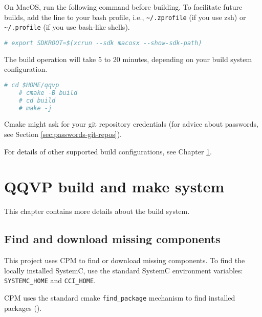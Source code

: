 \note On MacOS, run the following command before building. To facilitate
future builds, add the line to your bash profile, i.e.,
{\small{\lstinline!~/.zprofile!}} (if you use zsh) or
{\small{\lstinline!~/.profile!}} (if you use bash-like shells).

\small
\begin{lstlisting}[language=bash]
    # export SDKROOT=$(xcrun --sdk macosx --show-sdk-path)
\end{lstlisting}
\normalsize



The build operation will take 5 to 20 minutes, depending on your build system configuration.

\small
\begin{lstlisting}[language=bash]
    # cd $HOME/qqvp
    # cmake -B build
    # cd build
    # make -j
\end{lstlisting}
\normalsize

Cmake might ask for your git repository credentials (for advice about passwords, see Section \ref{sec:passwords-git-repos}). \vspace{6pt}

For details of other supported build configurations, see Chapter \ref{ch:gs-build-make-system}.



\chapter{QQVP build and make system}
\label{ch:gs-build-make-system}

This chapter contains more details about the build system.


\section{Find and download missing components}

This project uses CPM {} to find or download missing components. To find the locally installed SystemC, use the standard SystemC environment variables: {\small{\lstinline!SYSTEMC_HOME!}} and {\small{\lstinline!CCI_HOME!}}. \leavevmode

CPM uses the standard cmake {\small{\lstinline!find_package!}} mechanism to find installed packages ({}). \leavevmode

